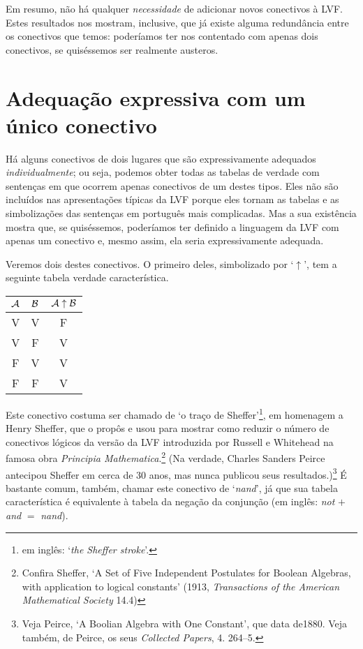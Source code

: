 Em resumo, não há qualquer \emph{necessidade} de adicionar novos conectivos à LVF.
Estes resultados nos mostram, inclusive, que já existe alguma redundância entre os conectivos que temos: poderíamos ter nos contentado com apenas dois conectivos, se quiséssemos ser realmente austeros.


\section{Adequação expressiva com um único conectivo}

Há alguns conectivos de dois lugares que são expressivamente adequados \emph{individualmente}; ou seja, podemos obter todas as tabelas de verdade com sentenças em que ocorrem apenas conectivos de um destes tipos.
Eles não são incluídos nas apresentações típicas da LVF porque eles tornam as tabelas e as simbolizações das sentenças em português mais complicadas.
Mas a sua existência mostra que, se quiséssemos, poderíamos ter definido a linguagem da LVF com apenas um conectivo e, mesmo assim, ela seria expressivamente adequada.

Veremos dois destes conectivos.
O primeiro deles, simbolizado por `$\uparrow$', tem a seguinte tabela verdade característica. 
\begin{center}
\begin{tabular}{c c | c}
$\mathcal{A}$ & $\mathcal{B}$ & $\mathcal{A} \mathrel{\uparrow} \mathcal{B}$\\
\hline
 V & V & F \\
 V & F & V \\
 F & V & V  \\
 F & F & V
\end{tabular}
\end{center}

 Este conectivo costuma ser chamado de `o traço de Sheffer'\footnote{ em inglês: `\emph{the Sheffer stroke}'.}, em homenagem a Henry Sheffer, que o propôs e usou para mostrar como reduzir o número de conectivos lógicos da versão da LVF introduzida por Russell e Whitehead na famosa obra  \emph{Principia Mathematica}.\footnote{
 Confira Sheffer, `A Set of Five Independent Postulates for Boolean Algebras, with application to logical constants' (1913, \emph{Transactions of the American Mathematical Society} 14.4)}
 (Na verdade, Charles Sanders Peirce antecipou Sheffer em cerca de 30 anos, mas nunca publicou seus resultados.)\footnote{
 Veja Peirce, `A Boolian Algebra with One Constant', que data de1880. Veja também, de Peirce, os seus  \emph{Collected Papers}, 4. 264--5.}
 É bastante comum, também, chamar este conectivo de `\emph{nand}', já que sua tabela característica é equivalente à tabela da negação da conjunção (em inglês: \emph{not} $+$ \emph{and} $=$ \emph{nand}).



